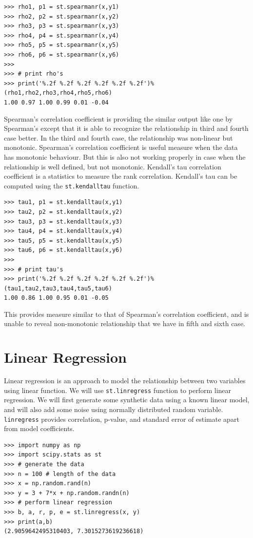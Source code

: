 \documentclass[10pt]{book}
\begin{document}
{\begin{verbatim}
>>> rho1, p1 = st.spearmanr(x,y1)
>>> rho2, p2 = st.spearmanr(x,y2)
>>> rho3, p3 = st.spearmanr(x,y3)
>>> rho4, p4 = st.spearmanr(x,y4)
>>> rho5, p5 = st.spearmanr(x,y5)
>>> rho6, p6 = st.spearmanr(x,y6)
>>> 
>>> # print rho's
>>> print('%.2f %.2f %.2f %.2f %.2f %.2f')%(rho1,rho2,rho3,rho4,rho5,rho6)
1.00 0.97 1.00 0.99 0.01 -0.04
\end{verbatim} \afterverb
Spearman's correlation coefficient is providing the similar output like one by Spearman's except that it is able to recognize the relationship in third and fourth case better. In the third and fourth case, the relationship was non-linear but monotonic. Spearman's correlation coefficient is useful measure when the data has monotonic behaviour. But this is also not working properly in case when the relationship is well defined, but not monotonic. Kendall's tau correlation coefficient is a statistics to measure the rank correlation. Kendall's tau can be computed using the \verb"st.kendalltau" function. 
\beforeverb \begin{verbatim}
>>> tau1, p1 = st.kendalltau(x,y1)
>>> tau2, p2 = st.kendalltau(x,y2)
>>> tau3, p3 = st.kendalltau(x,y3)
>>> tau4, p4 = st.kendalltau(x,y4)
>>> tau5, p5 = st.kendalltau(x,y5)
>>> tau6, p6 = st.kendalltau(x,y6)
>>> 
>>> # print tau's
>>> print('%.2f %.2f %.2f %.2f %.2f %.2f')%(tau1,tau2,tau3,tau4,tau5,tau6)
1.00 0.86 1.00 0.95 0.01 -0.05
\end{verbatim} \afterverb
This provides measure similar to that of Spearman's correlation coefficient, and is unable to reveal non-monotonic relationship that we have in fifth and sixth case. 

\section{Linear Regression}
Linear regression is an approach to model the relationship between two variables using linear function. We will use \verb"st.linregress" function to perform linear regression. We will first generate some synthetic data using a known linear model,
and will also add some noise using normally distributed random variable. \verb"linregress" provides correlation, p-value, and standard error of estimate apart from model coefficients.  

\beforeverb \begin{verbatim}
>>> import numpy as np
>>> import scipy.stats as st
>>> # generate the data
>>> n = 100 # length of the data
>>> x = np.random.rand(n)
>>> y = 3 + 7*x + np.random.randn(n)
>>> # perform linear regression
>>> b, a, r, p, e = st.linregress(x, y)
>>> print(a,b)
(2.9059642495310403, 7.3015273619236618)
\end{verbatim} \afterverb

}
\end{document}
